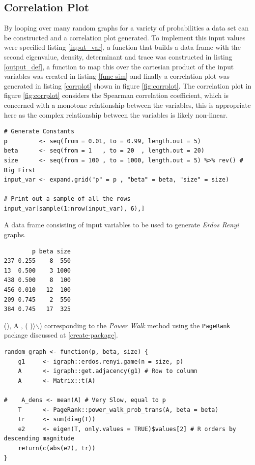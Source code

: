 \documentclass[11pt]{article}
\begin{document}
\subsection{Correlation Plot}
\label{correlation-plot}
By looping over many random graphs for a variety of probabilities a data set can
be constructed and a correlation plot generated. To implement this
input values were specified listing \ref{input_var}, a function that builds a
data frame with the second eigenvalue, density, determinant and trace was constructed in listing \ref{output_def}, a function to map this over the cartesian product of the input variables was created in listing \ref{func-sim} and finally a correlation plot was generated in listing \ref{corrplot} shown in figure \ref{fig:corrplot}. The correlation plot in figure \ref{fig:corrplot} considers the Spearman correlation coefficient, which is concerned with a monotone relationship between the variables, this is appropriate here as the complex relationship between the variables is likely non-linear.


\begin{listing}[htbp]
\begin{verbatim}
# Generate Constants
p         <- seq(from = 0.01, to = 0.99, length.out = 5)
beta      <- seq(from = 1   , to = 20  , length.out = 20)
size      <- seq(from = 100 , to = 1000, length.out = 5) %>% rev() # Big First
input_var <- expand.grid("p" = p , "beta" = beta, "size" = size)

# Print out a sample of all the rows
input_var[sample(1:nrow(input_var), 6),]
\end{verbatim}
\caption{\label{input_var}A data frame consisting of input variables to be used to generate \emph{Erdos Renyi} graphs.}
\end{listing}

\begin{verbatim}
        p beta size
237 0.255    8  550
13  0.500    3 1000
438 0.500    8  100
456 0.010   12  100
209 0.745    2  550
384 0.745   17  325
\end{verbatim}


\left(\right), \left\lvert A \right\rvert,
\left(  \right)\right\(\rangle\)$\backslash$) corresponding to the \emph{Power Walk} method using the \texttt{PageRank} package discussed at \ref{create-package}.
\begin{verbatim}
random_graph <- function(p, beta, size) {
    g1     <- igraph::erdos.renyi.game(n = size, p)
    A      <- igraph::get.adjacency(g1) # Row to column
    A      <- Matrix::t(A)

#    A_dens <- mean(A) # Very Slow, equal to p
    T      <- PageRank::power_walk_prob_trans(A, beta = beta)
    tr     <- sum(diag(T))
    e2     <- eigen(T, only.values = TRUE)$values[2] # R orders by descending magnitude
    return(c(abs(e2), tr))
}
\end{verbatim}
\end{document}
